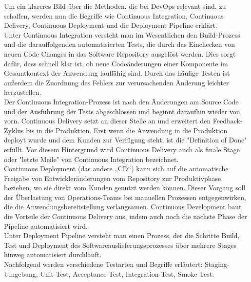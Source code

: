 Um ein klareres Bild über die Methoden, die bei DevOps relevant sind, zu schaffen, werden nun die Begriffe wie Continuous Integration, Continuous Delivery, Continuous Deployment und die Deployment Pipeline erklärt. \\

Unter Continuous Integration versteht man im Wesentlichen den Build-Prozess und die darauffolgenden automatisierten Tests, die durch das Einchecken von neuen Code Changes in das Software Repository ausgelöst werden. Dies sorgt dafür, dass schnell klar ist, ob neue Codeänderungen einer Komponente im Gesamtkontext der Anwendung lauffähig sind. Durch das häufige Testen ist außerdem die Zuordnung des Fehlers zur verursachenden Änderung leichter herzustellen.\\

Der Continuous Integration-Prozess ist nach den Änderungen am Source Code und der Ausführung der Tests abgeschlossen und beginnt daraufhin wieder von vorn. Continuous Delivery setzt an dieser Stelle an und erweitert den Feedback-Zyklus bis in die Produktion. Erst wenn die Anwendung in die Produktion deployt wurde und dem Kunden zur Verfügung steht, ist die "Definition of Done" erfüllt. Vor diesem Hintergrund wird Continuous Delivery auch als finale Stage oder "letzte Meile" von Continuous Integration bezeichnet.\\

Continuous Deployment (das andere „CD“) kann sich auf die automatische Freigabe von Entwickleränderungen vom Repository zur Produktivphase beziehen, wo sie direkt vom Kunden genutzt werden können. Dieser Vorgang soll der Überlastung von Operations-Teams bei manuellen Prozessen entgegenwirken, die die Anwendungsbereitstellung verlangsamen. Continuous Development baut die Vorteile der Continuous Delivery aus, indem auch noch die nächste Phase der Pipeline automatisiert wird.\\

Unter Deployment Pipeline versteht man einen Prozess, der die Schritte Build, Test und Deployment des Softwareauslieferungsprozesses über mehrere Stages hinweg automatisiert durchläuft.\\


Nachfolgend werden verschiedene Testarten und Begriffe erläutert: Staging-Umgebung, Unit Test, Acceptance Test, Integration Test, Smoke Test: